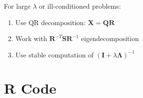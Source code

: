 \documentclass[11pt, a4paper]{article}
\begin{document}
\begin{remark}
For large $\lambda$ or ill-conditioned problems:
\begin{enumerate}
    \item Use QR decomposition: $\mathbf{X} = \mathbf{Q}\mathbf{R}$
    \item Work with $\mathbf{R}^{-T}\mathbf{S}\mathbf{R}^{-1}$ eigendecomposition
    \item Use stable computation of $(\mathbf{I} + \lambda\bm{\Lambda})^{-1}$
\end{enumerate}
\end{remark}
\section{R Code}


\end{document}
